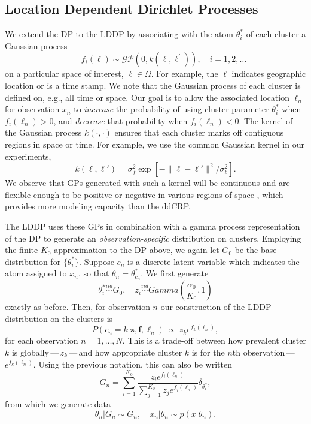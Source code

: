 \documentclass[runningheads,a4paper]{iscide}
\begin{document}
\subsection{Location Dependent Dirichlet Processes}
We extend the DP to the LDDP by associating with the atom $\theta_i^*$ of each cluster a Gaussian process $$\qquad {f}_i(\ell)\sim \mathcal{GP}(0,
k(\ell,\ell^\prime)), \quad i=1,2,\dots$$ on a particular space of interest, $\ell \in \Omega$. For example, the $\ell$ indicates geographic location or is a time stamp. We note that the Gaussian process of each cluster is defined on, e.g., all time or space. Our goal is to allow the associated location $\ell_n$ for observation $x_n$ to \textit{increase} the probability of using cluster parameter $\theta_i^*$ when $f_i(\ell_n) > 0$, and \textit{decrease} that probability when $f_i(\ell_n) < 0$. The kernel of the Gaussian process $k(\cdot,\cdot)$ ensures that each cluster marks off contiguous regions in space or time. For example, we use the common Gaussian kernel in our experiments,
\begin{equation}\label{eqn.rbf}
 k(\ell,\ell') = \sigma_f^2 \exp\left[-\|\ell-\ell'\|^2/\sigma_{\ell}^2\right].
\end{equation}
We observe that GPs generated with such a kernel will be continuous and are flexible enough to be positive or negative in various regions of space \cite{Rasmussen:2006}, which provides more modeling capacity than the ddCRP.

The LDDP uses these GPs in combination with a gamma process representation of the DP to generate an \textit{observation-specific} distribution on clusters. Employing the finite-$K_0$ approximation to the DP above, we again let $G_0$ be the base distribution for
$\{\theta_i^*\}$. Suppose $c_n$ is a discrete latent variable which
indicates the atom assigned to $x_n$, so that $\theta_n = \theta_{c_n}^*$. We first generate
$$\theta_i^* \stackrel{iid}{\sim} G_0, \quad z_i \stackrel{iid}{\sim} Gamma(\textstyle\frac{\alpha_0}{K_0},1)$$
exactly as before. Then, for observation $n$ our construction of the LDDP distribution on the clusters is
\begin{equation}
P(c_n=k|\boldsymbol{z},\boldsymbol{f},\ell_n) ~ \propto ~ z_k e^{f_k(\ell_n)},\label{eqn_cn}
\end{equation}
for each observation $n=1,\dots,N$. This is a trade-off between how prevalent cluster $k$ is globally\,---\,$z_k$\,---\,and how appropriate cluster $k$ is for the $n$th observation\,---\,$e^{f_k(\ell_n)}$.  Using the previous notation, this can also be written
\begin{equation}\label{eqn.Gn}
G_n=\sum_{i=1}^{K_0} \frac{z_i e^{f_i(\ell_n)}}{\sum_{j=1}^{K_0} z_j e^{f_j(\ell_n)}} \delta_{\theta_i^*},
\end{equation}
from which we generate data
\begin{equation}
 \theta_n|G_n \sim G_n, \quad x_n|\theta_n \sim p(x|\theta_{n}) .
\end{equation}
\end{document}
